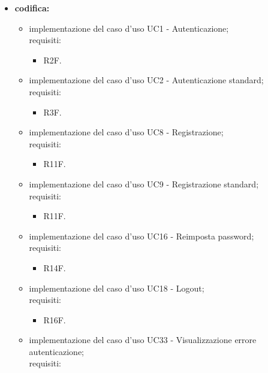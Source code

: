 \begin{itemize}
    \item \textbf{codifica:}
          \begin{itemize}
              \item implementazione del caso d'uso UC1 - Autenticazione;\\ requisiti:
                    \begin{itemize}
                        \item R2F.
                    \end{itemize}
              \item implementazione del caso d'uso UC2 - Autenticazione standard;\\ requisiti:
                    \begin{itemize}
                        \item R3F.
                    \end{itemize}
              \item implementazione del caso d'uso UC8 - Registrazione;\\ requisiti:
                    \begin{itemize}
                        \item R11F.
                    \end{itemize}
              \item implementazione del caso d'uso UC9 - Registrazione standard;\\ requisiti:
                    \begin{itemize}
                        \item R11F.
                    \end{itemize}
              \item implementazione del caso d'uso UC16 - Reimposta password;\\ requisiti:
                    \begin{itemize}
                        \item R14F.
                    \end{itemize}
              \item implementazione del caso d'uso UC18 - Logout;\\ requisiti:
                    \begin{itemize}
                        \item R16F.
                    \end{itemize}
              \item implementazione del caso d'uso UC33 - Visualizzazione errore autenticazione;\\ requisiti:

\end{itemize}
\end{itemize}
